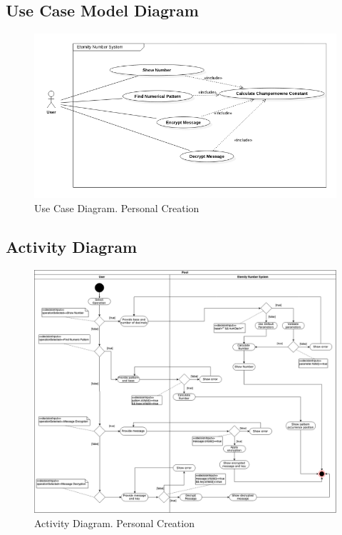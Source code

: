 \documentclass{report}
\begin{document}
\subsection{Use Case Model Diagram}

\begin{figure}[H]
\includegraphics[scale=1.1]{images/useCaseDiagram.png}
\caption[Use Case Diagram]{Use Case Diagram. Personal Creation}
\end{figure}
\subsection{Activity Diagram}

\begin{figure}[H]
\includegraphics[scale=0.35]{images/activity.png}
\caption[Activity Diagram]{Activity Diagram. Personal Creation}
\end{figure}
\end{document}
